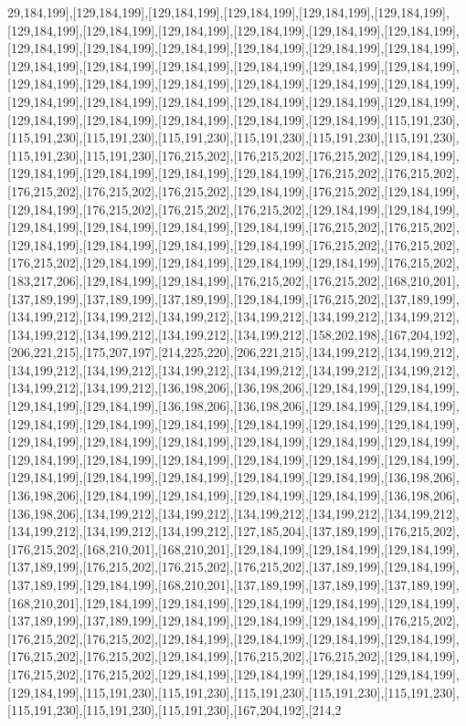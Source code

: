 29,184,199],[129,184,199],[129,184,199],[129,184,199],[129,184,199],[129,184,199],[129,184,199],[129,184,199],[129,184,199],[129,184,199],[129,184,199],[129,184,199],[129,184,199],[129,184,199],[129,184,199],[129,184,199],[129,184,199],[129,184,199],[129,184,199],[129,184,199],[129,184,199],[129,184,199],[129,184,199],[129,184,199],[129,184,199],[129,184,199],[129,184,199],[129,184,199],[129,184,199],[129,184,199],[129,184,199],[129,184,199],[129,184,199],[129,184,199],[129,184,199],[129,184,199],[129,184,199],[129,184,199],[129,184,199],[129,184,199],[129,184,199],[115,191,230],[115,191,230],[115,191,230],[115,191,230],[115,191,230],[115,191,230],[115,191,230],[115,191,230],[115,191,230],[176,215,202],[176,215,202],[176,215,202],[129,184,199],[129,184,199],[129,184,199],[129,184,199],[129,184,199],[176,215,202],[176,215,202],[176,215,202],[176,215,202],[176,215,202],[129,184,199],[176,215,202],[129,184,199],[129,184,199],[176,215,202],[176,215,202],[176,215,202],[129,184,199],[129,184,199],[129,184,199],[129,184,199],[129,184,199],[129,184,199],[176,215,202],[176,215,202],[129,184,199],[129,184,199],[129,184,199],[129,184,199],[176,215,202],[176,215,202],[176,215,202],[129,184,199],[129,184,199],[129,184,199],[129,184,199],[176,215,202],[183,217,206],[129,184,199],[129,184,199],[176,215,202],[176,215,202],[168,210,201],[137,189,199],[137,189,199],[137,189,199],[129,184,199],[176,215,202],[137,189,199],[134,199,212],[134,199,212],[134,199,212],[134,199,212],[134,199,212],[134,199,212],[134,199,212],[134,199,212],[134,199,212],[134,199,212],[158,202,198],[167,204,192],[206,221,215],[175,207,197],[214,225,220],[206,221,215],[134,199,212],[134,199,212],[134,199,212],[134,199,212],[134,199,212],[134,199,212],[134,199,212],[134,199,212],[134,199,212],[134,199,212],[136,198,206],[136,198,206],[129,184,199],[129,184,199],[129,184,199],[129,184,199],[136,198,206],[136,198,206],[129,184,199],[129,184,199],[129,184,199],[129,184,199],[129,184,199],[129,184,199],[129,184,199],[129,184,199],[129,184,199],[129,184,199],[129,184,199],[129,184,199],[129,184,199],[129,184,199],[129,184,199],[129,184,199],[129,184,199],[129,184,199],[129,184,199],[129,184,199],[129,184,199],[129,184,199],[129,184,199],[129,184,199],[129,184,199],[136,198,206],[136,198,206],[129,184,199],[129,184,199],[129,184,199],[129,184,199],[136,198,206],[136,198,206],[134,199,212],[134,199,212],[134,199,212],[134,199,212],[134,199,212],[134,199,212],[134,199,212],[134,199,212],[127,185,204],[137,189,199],[176,215,202],[176,215,202],[168,210,201],[168,210,201],[129,184,199],[129,184,199],[129,184,199],[137,189,199],[176,215,202],[176,215,202],[176,215,202],[137,189,199],[129,184,199],[137,189,199],[129,184,199],[168,210,201],[137,189,199],[137,189,199],[137,189,199],[168,210,201],[129,184,199],[129,184,199],[129,184,199],[129,184,199],[129,184,199],[137,189,199],[137,189,199],[129,184,199],[129,184,199],[129,184,199],[176,215,202],[176,215,202],[176,215,202],[129,184,199],[129,184,199],[129,184,199],[129,184,199],[176,215,202],[176,215,202],[129,184,199],[176,215,202],[176,215,202],[129,184,199],[176,215,202],[176,215,202],[129,184,199],[129,184,199],[129,184,199],[129,184,199],[129,184,199],[115,191,230],[115,191,230],[115,191,230],[115,191,230],[115,191,230],[115,191,230],[115,191,230],[115,191,230],[167,204,192],[214,2